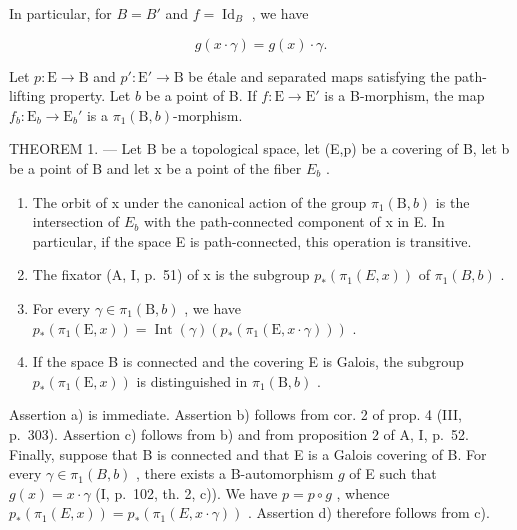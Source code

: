 In particular, for \(B = B'\) and \(f = \operatorname{Id}_{B}\) , we have

\[
g (x \cdot \gamma) = g (x) \cdot \gamma .\tag{4}
\]

Let \(p \colon \mathrm{E} \to \mathrm{B}\) and \(p' \colon \mathrm{E}' \to \mathrm{B}\) be étale and separated maps satisfying the path-lifting property. Let \(b\) be a point of B. If \(f \colon \mathrm{E} \to \mathrm{E}'\) is a B-morphism, the map \(f_b \colon \mathrm{E}_b \to \mathrm{E}_b'\) is a \(\pi_1(\mathrm{B}, b)\)-morphism.

THEOREM 1. --- Let B be a topological space, let (E,p) be a covering of B, let b be a point of B and let x be a point of the fiber \(E_{b}\) .

\begin{enumerate}
\def\labelenumi{\alph{enumi})}
\item
  The orbit of x under the canonical action of the group \(\pi_{1}(\mathrm{B},b)\) is the intersection of \(E_{b}\) with the path-connected component of x in E. In particular, if the space E is path-connected, this operation is transitive.
\item
  The fixator (A, I, p.~51) of x is the subgroup \(p_{*}(\pi_{1}(E,x))\) of \(\pi_{1}(B,b)\) .
\item
  For every \(\gamma \in \pi_1(\mathrm{B},b)\) , we have \(p_*(\pi_1(\mathrm{E},x)) = \operatorname{Int}(\gamma)(p_*(\pi_1(\mathrm{E},x \cdot \gamma)))\) .
\item
  If the space B is connected and the covering E is Galois, the subgroup \(p_{*}(\pi_{1}(\mathrm{E},x))\) is distinguished in \(\pi_{1}(\mathrm{B},b)\) .
\end{enumerate}

Assertion a) is immediate. Assertion b) follows from cor. 2 of prop. 4 (III, p.~303). Assertion c) follows from b) and from proposition 2 of A, I, p.~52. Finally, suppose that B is connected and that E is a Galois covering of B. For every \(\gamma \in \pi_1(B,b)\) , there exists a B-automorphism \(g\) of E such that \(g(x) = x \cdot \gamma\) (I, p.~102, th. 2, c)). We have \(p = p \circ g\) , whence \(p_*(\pi_1(E,x)) = p_*(\pi_1(E,x \cdot \gamma))\) . Assertion d) therefore follows from c).
